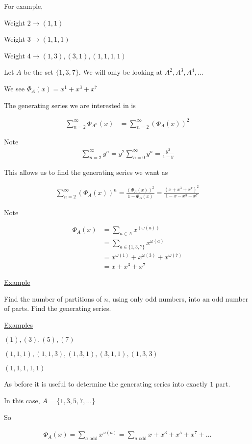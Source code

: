 \documentclass{article}
\begin{document}
For example,

Weight $2 \rightarrow (1,1)$ 

Weight $3 \rightarrow (1,1,1)$

Weight $4 \rightarrow (1,3),(3,1),(1,1,1,1)$

Let $A$ be the set $\{1,3,7\}.$ We will only be looking at $A^2, A^3, A^4, \ldots$

We see $\Phi_{A}(x) = x^1 + x^3 + x^7$

The generating series we are interested in is

\begin{align*}
\sum_{n=2}^{\infty}\Phi_{A^n}(x)
&= \sum_{n=2}^{\infty}(\Phi_{A}(x))^2
\end{align*}

Note 
\begin{align*}
\sum_{n=2}^{\infty}y^n = y^2\sum_{n=0}^{\infty}y^n = \frac{y^2}{1-y}
\end{align*}

This allows us to find the generating series we want as

\begin{align*}
    \sum_{n=2}^{\infty}(\Phi_{A}(x))^n = \frac{(\Phi_{A}(x))^2}{1-\Phi_{A}(x)} = \frac{(x+x^3+x^7)^2}{1-x-x^3-x^7}
\end{align*}

Note

\begin{align*}
    \Phi_{A}(x) &= \sum_{a \in A}x^{(\omega(a))} \\
    &= \sum_{a \in \{1,3,7\}} x^{\omega(a)} \\
    &= x^{\omega(1)} + x^{\omega(3)} + x^{\omega(7)} \\
    &= x + x^3 + x^7
\end{align*}

\underline{Example}

Find the number of partitions of $n$, using only odd numbers, into an odd number of parts. Find the generating series.

\underline{Examples}

$(1),(3),(5),(7)$

$(1,1,1),(1,1,3),(1,3,1),(3,1,1),(1,3,3)$

$(1,1,1,1,1)$

As before it is useful to determine the generating series into exactly $1$ part. 

In this case, $A = \{1,3,5,7,\ldots\}$

So 

\begin{align*}
    \Phi_{A}(x) = \sum_{a \text{ odd}}x^{\omega(a)} = \sum_{a \text{ odd}} x + x^3 + x^5 + x^7 + \ldots
\end{align*}
\end{document}
